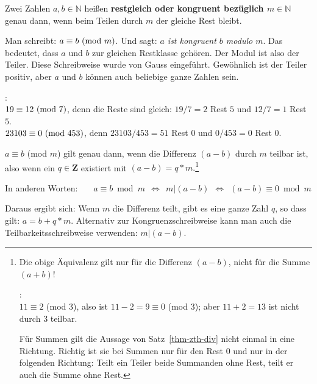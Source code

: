 \begin{refsegment}
\begin{definition}\label{def-zth-congruence} 
Zwei Zahlen $a, b \in \mathbb{N}$  heißen 
\textbf{restgleich oder kongruent bezüglich $m \in \mathbb{N}$}  genau dann,
wenn beim Teilen durch $m$ der gleiche Rest bleibt.
\end{definition}

Man schreibt: $a \equiv b {\rm ~(mod~} m)$. Und sagt:  {\em $a$ ist kongruent $b$ modulo $m$}. Das bedeutet,
dass $a$ und $b$ zur gleichen Restklasse gehören. Der Modul ist also der Teiler. Diese Schreibweise wurde von
Gauss eingeführt. Gewöhnlich ist der Teiler positiv, aber $a$ und $b$ können auch beliebige ganze Zahlen sein.

\begin{example}{:}\\
\hspace*{2em}$19 \equiv 12 {\rm ~(mod~} 7)$,
           denn die Reste sind gleich:  $19 / 7 = 2$ Rest $5$  und  $12 / 7 = 1$ Rest $5$.\\
\hspace*{2em}$23103 \equiv 0 {\rm ~(mod~} 453)$, denn $23103 / 453 = 51$ Rest $0$  und  $0 / 453 = 0$ Rest $0$.
\end{example}

\begin{satz}\label{thm-zth-div}
$a \equiv b$ (mod $m$) gilt genau dann,  wenn die Differenz $(a - b)$ durch $m$
teilbar ist, also wenn ein $q\in \mathbf{Z}$ existiert mit $ (a-b)=q*m.$\footnote{%
Die obige Äquivalenz gilt nur für die Differenz $(a - b)$, nicht für die
Summe $(a + b)$!

\begin{example}{:}\\
$11 \equiv 2$ (mod $3$), also ist $11 - 2 = 9 \equiv 0$ (mod $3$); aber $11 + 2 = 13$ ist nicht durch $3$ teilbar.
\end{example}

Für Summen gilt die Aussage von Satz~\ref{thm-zth-div} nicht einmal
in eine Richtung. Richtig ist sie bei Summen nur für den Rest $0$ und nur in
der folgenden Richtung: Teilt ein Teiler beide Summanden ohne Rest, teilt er
auch die Summe ohne Rest.
}
\end{satz}

In anderen Worten:~~~
$ a \equiv b \bmod{m}   ~~ \Longleftrightarrow ~~
  m | (a-b)             ~~ \Longleftrightarrow ~~
  (a-b) \equiv 0 \bmod{m} $


Daraus ergibt sich: Wenn $m$ die Differenz teilt, gibt es eine ganze Zahl $q$, so
dass gilt: $a = b + q*m$.
Alternativ zur Kongruenzschreibweise kann man auch die Teilbarkeitsschreibweise
verwenden: $m | (a - b)$.\\


\end{refsegment}

